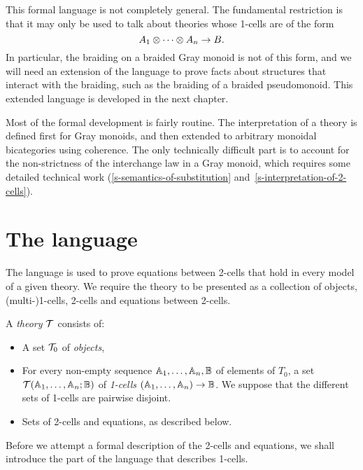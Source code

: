 \documentclass{robinthesisdraft}
\begin{document}
This formal language is not completely general. The fundamental
restriction is that it may only be used to talk about theories
whose 1-cells are of the form
\[
	A_{1}\tn\cdots\tn A_{n} \to B.
\]
In particular, the braiding on a braided Gray monoid is not of this
form, and we will need an extension of the language to prove facts about
structures that interact with the braiding, such as the braiding of
a braided pseudomonoid. This extended language is developed in
the next chapter.

Most of the formal development is fairly routine. The interpretation of
a theory is defined first for Gray monoids, and then extended to arbitrary
monoidal bicategories using coherence. The only technically difficult part
is to account for the non-strictness of the interchange law in a Gray monoid,
which requires some detailed technical work (\ref{s-semantics-of-substitution}
and~\ref{s-interpretation-of-2-cells}).

\section{The language}
The language is used to prove equations between 2-cells that hold in
every model of a given theory.
%
We require the theory to be presented as a collection
of objects, (multi-)1-cells, 2-cells and equations between 2-cells.

A \emph{theory} ${\mathcal{T}}$ consists of:
\begin{itemize}
	\item A set ${\mathcal{T}}_{0}$ of \emph{objects},
	\item For every non-empty sequence $\mathbb{A}_{1}, \ldots, \mathbb{A}_{n}, \mathbb{B}$ of
		elements of $T_{0}$,
		a set ${\mathcal{T}}(\mathbb{A}_{1},\ldots,\mathbb{A}_{n};\mathbb{B})$
		of \emph{1-cells} $(\mathbb{A}_{1}, \dots, \mathbb{A}_{n})\to \mathbb{B}$.
		We suppose that the different sets of 1-cells are pairwise disjoint.
	\item Sets of 2-cells and equations, as described below.
\end{itemize}
Before we attempt a formal description of the 2-cells and equations,
we shall introduce the part of the language that describes 1-cells.
\end{document}
